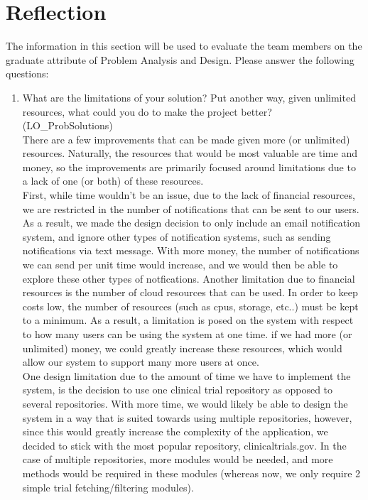 \documentclass[12pt, titlepage]{article}
\begin{document}
\section{Reflection}

The information in this section will be used to evaluate the team members on the
graduate attribute of Problem Analysis and Design.  Please answer the following questions:

\begin{enumerate}
  \item What are the limitations of your solution?  Put another way, given
  unlimited resources, what could you do to make the project better? (LO\_ProbSolutions)\\

  There are a few improvements that can be made given more (or unlimited) resources. Naturally, the resources that 
  would be most valuable are time and money, so the improvements are primarily focused around limitations due to a lack of 
  one (or both) of these resources.\\

  First, while time wouldn't be an issue, due to the lack of financial resources, we are restricted in the number of notifications that 
  can be sent to our users. As a result, we made the design decision to only include an email notification system, and ignore other types 
  of notification systems, such as sending notifications via text message. With more money, the number of notifications we can send per unit time 
  would increase, and we would then be able to explore these other types of notfications. Another limitation due to financial resources
  is the number of cloud resources that can be used. In order to keep costs low, the number of resources (such as cpus, storage, etc..) must 
  be kept to a minimum. As a result, a limitation is posed on the system with respect to how many users can be using the system at one time. if we had 
  more (or unlimited) money, we could greatly increase these resources, which would allow our system to support many more users at once.\\
  
  One design limitation due to the amount of time we have to implement the system, is the decision to use one clinical trial repository as 
  opposed to several repositories. With more time, we would likely be able to design the system in a way that is suited towards using 
  multiple repositories, however, since this would greatly increase the complexity of the application, we decided to stick with the most 
  popular repository, clinicaltrials.gov. In the case of multiple repositories, more modules would be needed, and more methods would be required 
  in these modules (whereas now, we only require 2 simple trial fetching/filtering modules).


\end{enumerate}
\end{document}
